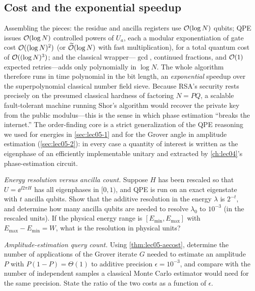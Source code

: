 \subsection*{Cost and the exponential speedup}

Assembling the pieces: the residue and ancilla registers use $\mathcal{O}(\log N)$
qubits; QPE issues $\mathcal{O}(\log N)$ controlled powers of $U_a$, each a modular
exponentiation of gate cost $\mathcal{O}((\log N)^{2})$ (or $\widetilde{\mathcal{O}}(\log N)$
with fast multiplication), for a total quantum cost of
$\mathcal{O}((\log N)^{3})$; and the classical wrapper---$\gcd$, continued fractions,
and $\mathcal{O}(1)$ expected retries---adds only polynomially in $\log N$. The whole
algorithm therefore runs in time polynomial in the bit length, an
\emph{exponential} speedup over the superpolynomial classical number field sieve.
Because RSA's security rests precisely on the presumed classical hardness of
factoring $N=PQ$, a scalable fault-tolerant machine running Shor's algorithm would
recover the private key from the public modulus---this is the sense in which phase
estimation ``breaks the internet.'' The order-finding core is a strict
generalization of the QPE reasoning we used for energies in \cref{sec:lec05-1} and
for the Grover angle in amplitude estimation (\cref{sec:lec05-2}): in every case a
quantity of interest is written as the eigenphase of an efficiently implementable
unitary and extracted by \cref{ch:lec04}'s phase-estimation circuit.

\exercisesection
\begin{exercise}\label{ex:lec05-1}
\emph{Energy resolution versus ancilla count.} Suppose $H$ has been rescaled so
that $U=\ee^{\ii 2\pi H}$ has all eigenphases in $[0,1)$, and QPE is run on an
exact eigenstate with $t$ ancilla qubits. Show that the additive resolution in the
energy $\lambda$ is $2^{-t}$, and determine how many ancilla qubits are needed to
resolve $\lambda_0$ to $10^{-3}$ (in the rescaled units). If the physical energy
range is $[E_{\min},E_{\max}]$ with $E_{\max}-E_{\min}=W$, what is the resolution
in physical units?
\end{exercise}

\begin{exercise}\label{ex:lec05-2}
\emph{Amplitude-estimation query count.} Using \cref{thm:lec05-aecost}, determine
the number of applications of the Grover iterate $G$ needed to estimate an
amplitude $P$ with $P(1-P)=\Theta(1)$ to additive precision $\epsilon=10^{-3}$,
and compare with the number of independent samples a classical Monte Carlo
estimator would need for the same precision. State the ratio of the two costs as a
function of $\epsilon$.
\end{exercise}

